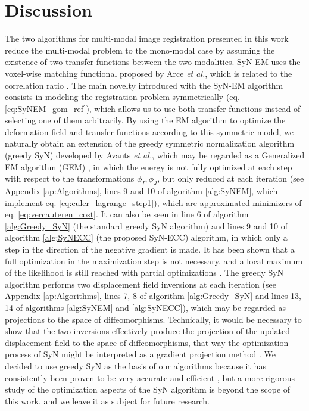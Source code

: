 \section{Discussion}
The two algorithms for multi-modal image registration presented in this work reduce the multi-modal problem to the mono-modal case by assuming the existence of two transfer functions between the two modalities. SyN-EM uses the voxel-wise matching functional proposed by Arce {\it et al.}\cite{Arce-santana2014}, which is related to the correlation ratio \citep{Roche1998}. The main novelty introduced with the SyN-EM algorithm consists in modeling the registration problem symmetrically (eq. \eqref{eq:SyNEM_gom_ref}), which allows us to use both transfer functions instead of selecting one of them arbitrarily. By using the EM algorithm to optimize the deformation field and transfer functions according to this symmetric model, we naturally obtain an extension of the greedy symmetric normalization algorithm (greedy SyN) developed by Avants {\it et al.}\cite{Avants2008, Avants2011}, which may be regarded as a Generalized EM algorithm (GEM) \citep{Neal1998}, in which the energy is not fully optimized at each step with respect to the transformations $\phi_{I}, \phi_{J}$, but only reduced at each iteration (see Appendix \ref{ap:Algorithms}, lines 9 and 10 of algorithm \ref{alg:SyNEM}, which implement eq. \eqref{eq:euler_lagrange_step1}), which are approximated minimizers of eq. \eqref{eq:vercauteren_cost}. It can also be seen in line 6 of algorithm \ref{alg:Greedy_SyN} (the standard greedy SyN algorithm) and lines 9 and 10 of algorithm \ref{alg:SyNECC} (the proposed SyN-ECC) algorithm, in which only a step in the direction of the negative gradient is made. It has been shown that a full optimization in the maximization step is not necessary, and a local maximum of the likelihood is still reached with partial optimizations \citep{Neal1998}. The greedy SyN algorithm performs two displacement field inversions at each iteration (see Appendix \ref{ap:Algorithms}, lines 7, 8 of algorithm \ref{alg:Greedy_SyN} and lines 13, 14 of algorithms \ref{alg:SyNEM} and \ref{alg:SyNECC}), which may be regarded as projections to the space of diffeomorphisms. Technically, it would be necessary to show that the two inversions effectively produce the projection of the updated displacement field to the space of diffeomorphisms, that way the optimization process of SyN might be interpreted as a gradient projection method \citep{Xiu2007}. We decided to use greedy SyN as the basis of our algorithms because it has consistently been proven to be very accurate and efficient \citep{Klein2009, Klein2010, Rohlfing2012}, but a more rigorous study of the optimization aspects of the SyN algorithm is beyond the scope of this work, and we leave it as subject for future research.\\

